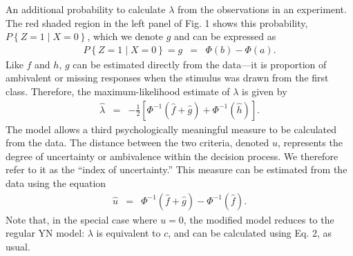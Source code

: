 \documentclass[man]{apa6}
\begin{document}
An additional probability to calculate $\lambda$ from the observations in an experiment. The red shaded region in the left panel of Fig. 1 shows this probability, $P\left\{Z=1\mid{}X=0\right\}$, which we denote $g$ and can be expressed as\begin{eqnarray*}
P\left\{Z=1\mid{}X=0\right\}=g&=&\Phi\left(b\right)-\Phi\left(a\right)\textrm{.}
\end{eqnarray*}
Like $f$ and $h$, $g$ can be estimated directly from the data---it is proportion of ambivalent or missing responses when the stimulus was drawn from the first class. Therefore, the maximum-likelihood estimate of $\lambda$ is given by
\begin{eqnarray}
\hat{\lambda}&=&-\frac{1}{2}\left[\Phi^{-1}\left(\hat{f}+\hat{g}\right)+\Phi^{-1}\left(\hat{h}\right)\right]\textrm{.}
\end{eqnarray}The model allows a third psychologically meaningful measure to be calculated from the data. The distance between the two criteria, denoted $u$, represents the degree of uncertainty or ambivalence within the decision process. We therefore refer to it as the ``index of uncertainty.'' This measure can be estimated from the data using the equation
\begin{eqnarray}
\hat{u}&=&\Phi^{-1}\left(\hat{f}+\hat{g}\right)-\Phi^{-1}\left(\hat{f}\right)\textrm{.}
\end{eqnarray}Note that, in the special case where $u=0$, the modified model reduces to the regular YN model: $\lambda$ is equivalent to $c$, and can be calculated using Eq. 2, as usual.
\end{document}
